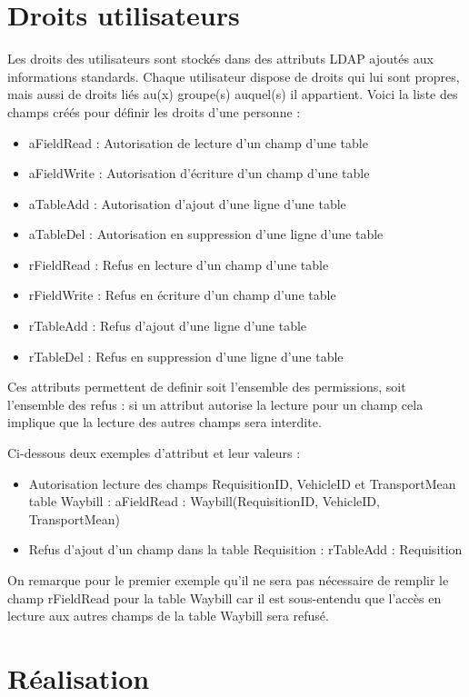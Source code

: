 \documentclass[11pt,fleqn]{report}
\begin{document}
\chapter{Droits utilisateurs}
Les droits des utilisateurs sont stockés dans des attributs LDAP ajoutés aux informations standards. Chaque utilisateur dispose de droits qui lui sont propres, mais aussi de droits liés au(x) groupe(s) auquel(s) il appartient.
Voici la liste des champs créés pour définir les droits d’une personne :
\begin{itemize}
\item aFieldRead : Autorisation de lecture d’un champ d’une table
\item aFieldWrite : Autorisation d’écriture d’un champ d’une table
\item aTableAdd : Autorisation d’ajout d’une ligne d’une table
\item aTableDel : Autorisation en suppression d’une ligne d’une table
\item rFieldRead : Refus en lecture d’un champ d’une table
\item rFieldWrite : Refus en écriture d’un champ d’une table
\item rTableAdd : Refus d’ajout d’une ligne d’une table
\item rTableDel : Refus en suppression d’une ligne d’une table
\end{itemize}

Ces attributs permettent de definir soit l'ensemble des permissions, soit l'ensemble des refus  : si un attribut autorise la lecture pour un champ cela implique que la lecture des autres champs sera interdite.

Ci-dessous deux exemples d’attribut et leur valeurs :
\begin{itemize}
\item Autorisation lecture des champs RequisitionID, VehicleID et TransportMean table Waybill : 
aFieldRead : Waybill(RequisitionID, VehicleID, TransportMean)
\item Refus d’ajout d’un champ dans la table Requisition : 
rTableAdd : Requisition
\end{itemize}

On remarque pour le premier exemple qu’il ne sera pas nécessaire de remplir le champ rFieldRead pour la table Waybill car il est sous-entendu que l’accès en lecture aux autres champs de la table Waybill sera refusé. 

\chapter{Réalisation}
\end{document}
